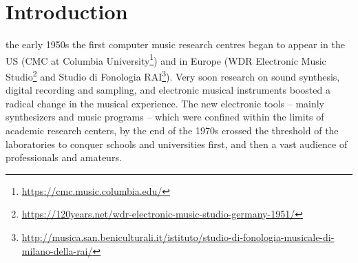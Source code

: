 \documentclass[journal]{IEEEtran}
\begin{document}
%
\IEEEpeerreviewmaketitle



\section{Introduction}
\label{sec:intro}
% 
% 
% 
% 
 the early 1950s the first computer music research centres began to appear in the US (CMC at Columbia University\footnote{\url{https://cmc.music.columbia.edu/}}) and in Europe (WDR Electronic Music Studio\footnote{\url{https://120years.net/wdr-electronic-music-studio-germany-1951/}} and Studio di Fonologia RAI\footnote{\url{http://musica.san.beniculturali.it/istituto/studio-di-fonologia-musicale-di-milano-della-rai/}}). Very soon research on sound synthesis, digital recording and sampling, and electronic musical instruments boosted a radical change in the musical experience. The new electronic tools -- mainly synthesizers and music programs -- which were confined within the limits of academic research centers, by the end of the 1970s crossed the threshold of the laboratories to conquer schools and universities first, and then a vast audience of professionals and amateurs. 
\end{document}
